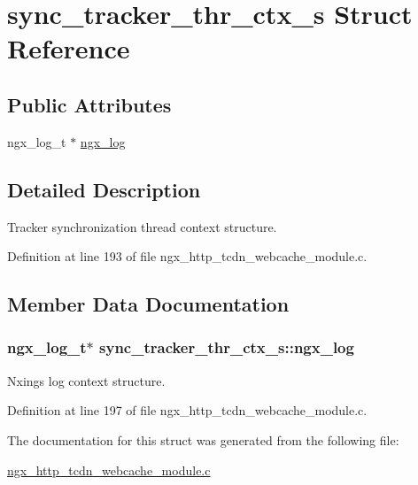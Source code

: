 \hypertarget{structsync__tracker__thr__ctx__s}{}\section{sync\+\_\+tracker\+\_\+thr\+\_\+ctx\+\_\+s Struct Reference}
\label{structsync__tracker__thr__ctx__s}
\subsection*{Public Attributes}
\begin{DoxyCompactItemize}
\item 
ngx\+\_\+log\+\_\+t $\ast$ \hyperlink{structsync__tracker__thr__ctx__s_ae978c201761fd1c534646e124e5f3be5}{ngx\+\_\+log}
\end{DoxyCompactItemize}


\subsection{Detailed Description}
Tracker synchronization thread context structure. 

Definition at line 193 of file ngx\+\_\+http\+\_\+tcdn\+\_\+webcache\+\_\+module.\+c.



\subsection{Member Data Documentation}
\subsubsection[{\texorpdfstring{ngx\+\_\+log}{ngx_log}}]{\setlength{\rightskip}{0pt plus 5cm}ngx\+\_\+log\+\_\+t$\ast$ sync\+\_\+tracker\+\_\+thr\+\_\+ctx\+\_\+s\+::ngx\+\_\+log}\hypertarget{structsync__tracker__thr__ctx__s_ae978c201761fd1c534646e124e5f3be5}{}\label{structsync__tracker__thr__ctx__s_ae978c201761fd1c534646e124e5f3be5}
Nxing\textquotesingle{}s log context structure. 

Definition at line 197 of file ngx\+\_\+http\+\_\+tcdn\+\_\+webcache\+\_\+module.\+c.



The documentation for this struct was generated from the following file\+:\begin{DoxyCompactItemize}
\item 
\hyperlink{ngx__http__tcdn__webcache__module_8c}{ngx\+\_\+http\+\_\+tcdn\+\_\+webcache\+\_\+module.\+c}\end{DoxyCompactItemize}
